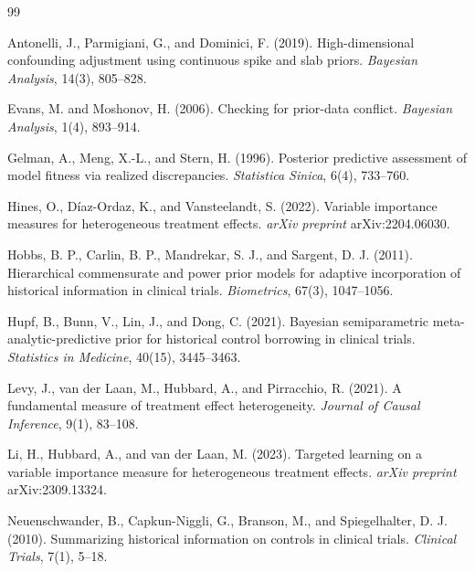 \begin{thebibliography}{99}

Antonelli, J., Parmigiani, G., and Dominici, F. (2019).
High-dimensional confounding adjustment using continuous spike and slab priors.
\textit{Bayesian Analysis}, 14(3), 805--828.

Evans, M. and Moshonov, H. (2006).
Checking for prior-data conflict.
\textit{Bayesian Analysis}, 1(4), 893--914.

Gelman, A., Meng, X.-L., and Stern, H. (1996).
Posterior predictive assessment of model fitness via realized discrepancies.
\textit{Statistica Sinica}, 6(4), 733--760.

Hines, O., D\'{i}az-Ordaz, K., and Vansteelandt, S. (2022).
Variable importance measures for heterogeneous treatment effects.
\textit{arXiv preprint} arXiv:2204.06030.

Hobbs, B. P., Carlin, B. P., Mandrekar, S. J., and Sargent, D. J. (2011).
Hierarchical commensurate and power prior models for adaptive incorporation of
historical information in clinical trials.
\textit{Biometrics}, 67(3), 1047--1056.

Hupf, B., Bunn, V., Lin, J., and Dong, C. (2021).
Bayesian semiparametric meta-analytic-predictive prior for historical control
borrowing in clinical trials.
\textit{Statistics in Medicine}, 40(15), 3445--3463.

Levy, J., van der Laan, M., Hubbard, A., and Pirracchio, R. (2021).
A fundamental measure of treatment effect heterogeneity.
\textit{Journal of Causal Inference}, 9(1), 83--108.

Li, H., Hubbard, A., and van der Laan, M. (2023).
Targeted learning on a variable importance measure for heterogeneous treatment
effects.
\textit{arXiv preprint} arXiv:2309.13324.

Neuenschwander, B., Capkun-Niggli, G., Branson, M., and Spiegelhalter, D. J.
(2010).
Summarizing historical information on controls in clinical trials.
\textit{Clinical Trials}, 7(1), 5--18.


\end{thebibliography}
